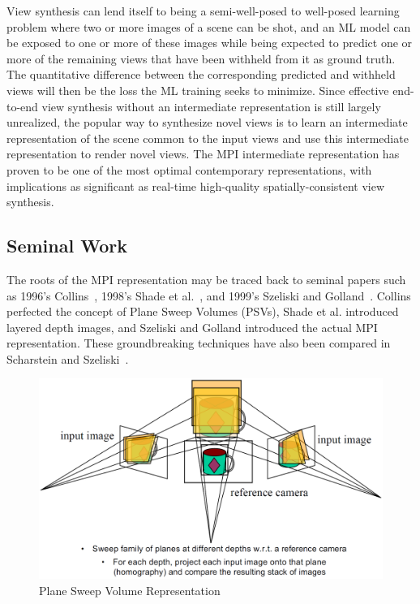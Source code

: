 View synthesis can lend itself to being a semi-well-posed to well-posed learning problem where two or more images of a scene can be shot, and an ML model can be exposed to one or more of these images while being expected to predict one or more of the remaining views that have been withheld from it as ground truth. The quantitative difference between the corresponding predicted and withheld views will then be the loss the ML training seeks to minimize. Since effective end-to-end view synthesis without an intermediate representation is still largely unrealized, the popular way to synthesize novel views is to learn an intermediate representation of the scene common to the input views and use this intermediate representation to render novel views. The MPI intermediate representation has proven to be one of the most optimal contemporary representations, with implications as significant as real-time high-quality spatially-consistent view synthesis.

\subsection{Seminal Work}\label{subsec:seminal-work}

The roots of the MPI representation may be traced back to seminal papers such as 1996's Collins~\cite{collins_space-sweep_1996}, 1998's Shade et al.~\cite{shade_layered_1998}, and 1999's Szeliski and Golland~\cite{szeliski_stereo_1999}. Collins perfected the concept of Plane Sweep Volumes (PSVs), Shade et al. introduced layered depth images, and Szeliski and Golland introduced the actual MPI representation. These groundbreaking techniques have also been compared in Scharstein and Szeliski~\cite{scharstein_taxonomy_2002}. 

\begin{figure}[!h]
    \includegraphics[width=1\columnwidth]{figures/plane-sweep-volume.png}
    \caption{Plane Sweep Volume Representation~\cite{svetlana_2019}}
    \label{fig:plane-sweep-volume}
\end{figure}

